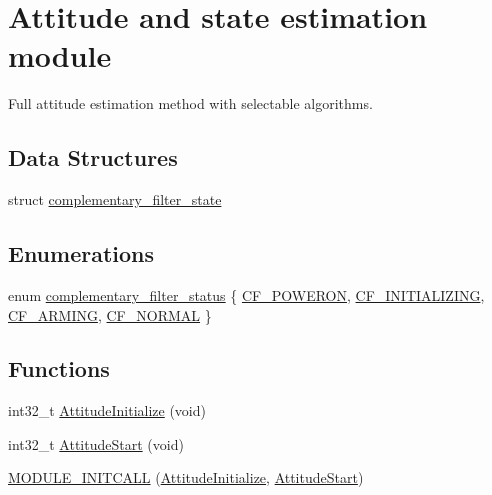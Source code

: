 \hypertarget{group___attitude_module}{\section{\-Attitude and state estimation module}
\label{group___attitude_module}
}


\-Full attitude estimation method with selectable algorithms.  


\subsection*{\-Data \-Structures}
\begin{DoxyCompactItemize}
\item 
struct \hyperlink{structcomplementary__filter__state}{complementary\-\_\-filter\-\_\-state}
\end{DoxyCompactItemize}
\subsection*{\-Enumerations}
\begin{DoxyCompactItemize}
\item 
enum \hyperlink{group___attitude_module_ga2a3dfab57b52ff023f9197d9afe06ff4}{complementary\-\_\-filter\-\_\-status} \{ \hyperlink{group___attitude_module_gga2a3dfab57b52ff023f9197d9afe06ff4a1b205074eafd92be8fbb945482e2c5c2}{\-C\-F\-\_\-\-P\-O\-W\-E\-R\-O\-N}, 
\hyperlink{group___attitude_module_gga2a3dfab57b52ff023f9197d9afe06ff4aee904149480808a1828f1e546b365411}{\-C\-F\-\_\-\-I\-N\-I\-T\-I\-A\-L\-I\-Z\-I\-N\-G}, 
\hyperlink{group___attitude_module_gga2a3dfab57b52ff023f9197d9afe06ff4aaeeddedb486c25be85918925490e4f7c}{\-C\-F\-\_\-\-A\-R\-M\-I\-N\-G}, 
\hyperlink{group___attitude_module_gga2a3dfab57b52ff023f9197d9afe06ff4acfd7a1440ea5820f0b90b2943586a542}{\-C\-F\-\_\-\-N\-O\-R\-M\-A\-L}
 \}
\end{DoxyCompactItemize}
\subsection*{\-Functions}
\begin{DoxyCompactItemize}
\item 
int32\-\_\-t \hyperlink{group___attitude_module_gab3e9047ab7c9b02bd61091a4a2e8f572}{\-Attitude\-Initialize} (void)
\item 
int32\-\_\-t \hyperlink{group___attitude_module_gaaa0dba388f0dec215cb7cbe55ad0356b}{\-Attitude\-Start} (void)
\item 
\hyperlink{group___attitude_module_ga785ebe70505bccce89d20aacd7996a21}{\-M\-O\-D\-U\-L\-E\-\_\-\-I\-N\-I\-T\-C\-A\-L\-L} (\hyperlink{group___attitude_module_gab3e9047ab7c9b02bd61091a4a2e8f572}{\-Attitude\-Initialize}, \hyperlink{group___attitude_module_gaaa0dba388f0dec215cb7cbe55ad0356b}{\-Attitude\-Start})
\end{DoxyCompactItemize}
